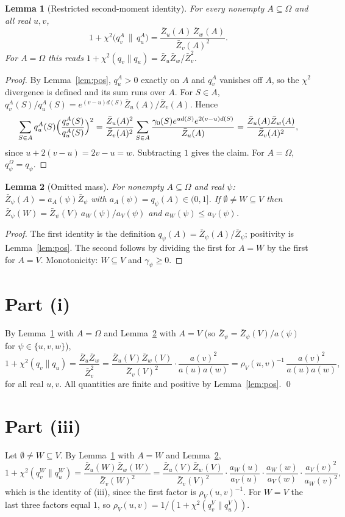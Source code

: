\documentclass[11pt]{article}
\newtheorem{lemma}{Lemma}
\theoremstyle{remark}
\newcommand{\Zb}{\bar Z}
\newcommand{\chisq}{\chi^2}
\begin{document}
\begin{lemma}[Restricted second-moment identity]\label{lem:sm}
For every nonempty $A\subseteq\Omega$ and all real $u,v$,
\[
1+\chisq\bigl(q_v^A\,\big\|\,q_u^A\bigr)=\frac{\Zb_u(A)\,\Zb_w(A)}{\Zb_v(A)^2}.
\]
For $A=\Omega$ this reads $1+\chisq(q_v\|q_u)=\Zb_u\Zb_w/\Zb_v^2$.
\end{lemma}
\begin{proof}
By Lemma~\ref{lem:pos}, $q_u^A>0$ exactly on $A$ and $q_v^A$ vanishes off $A$, so the $\chi^2$ divergence is defined and its sum runs over $A$. For $S\in A$, $q_v^A(S)/q_u^A(S)=e^{(v-u)d(S)}\Zb_u(A)/\Zb_v(A)$. Hence
\[
\sum_{S\in A}q_u^A(S)\Bigl(\frac{q_v^A(S)}{q_u^A(S)}\Bigr)^2
=\frac{\Zb_u(A)^2}{\Zb_v(A)^2}\sum_{S\in A}\frac{\gamma_0(S)e^{ud(S)}e^{2(v-u)d(S)}}{\Zb_u(A)}
=\frac{\Zb_u(A)\Zb_w(A)}{\Zb_v(A)^2},
\]
since $u+2(v-u)=2v-u=w$. Subtracting $1$ gives the claim. For $A=\Omega$, $q^\Omega_\psi=q_\psi$.
\end{proof}

\begin{lemma}[Omitted mass]\label{lem:om}
For nonempty $A\subseteq\Omega$ and real $\psi$: $\Zb_\psi(A)=a_A(\psi)\Zb_\psi$ with $a_A(\psi)=q_\psi(A)\in(0,1]$. If $\emptyset\neq W\subseteq V$ then $\Zb_\psi(W)=\Zb_\psi(V)\,a_W(\psi)/a_V(\psi)$ and $a_W(\psi)\le a_V(\psi)$.
\end{lemma}
\begin{proof}
The first identity is the definition $q_\psi(A)=\Zb_\psi(A)/\Zb_\psi$; positivity is Lemma~\ref{lem:pos}. The second follows by dividing the first for $A=W$ by the first for $A=V$. Monotonicity: $W\subseteq V$ and $\gamma_\psi\ge0$.
\end{proof}

\section{Part (i)}
By Lemma~\ref{lem:sm} with $A=\Omega$ and Lemma~\ref{lem:om} with $A=V$ (so $\Zb_\psi=\Zb_\psi(V)/a(\psi)$ for $\psi\in\{u,v,w\}$),
\[
1+\chisq(q_v\|q_u)=\frac{\Zb_u\Zb_w}{\Zb_v^2}
=\frac{\Zb_u(V)\Zb_w(V)}{\Zb_v(V)^2}\cdot\frac{a(v)^2}{a(u)a(w)}
=\rho_V(u,v)^{-1}\,\frac{a(v)^2}{a(u)a(w)},
\]
for all real $u,v$. All quantities are finite and positive by Lemma~\ref{lem:pos}. \qed

\section{Part (iii)}
Let $\emptyset\ne W\subseteq V$. By Lemma~\ref{lem:sm} with $A=W$ and Lemma~\ref{lem:om},
\[
1+\chisq(q_v^W\|q_u^W)=\frac{\Zb_u(W)\Zb_w(W)}{\Zb_v(W)^2}
=\frac{\Zb_u(V)\Zb_w(V)}{\Zb_v(V)^2}\cdot\frac{a_W(u)}{a_V(u)}\cdot\frac{a_W(w)}{a_V(w)}\cdot\frac{a_V(v)^2}{a_W(v)^2},
\]
which is the identity of (iii), since the first factor is $\rho_V(u,v)^{-1}$. For $W=V$ the last three factors equal $1$, so $\rho_V(u,v)=1/(1+\chisq(q_v^V\|q_u^V))$.
\end{document}
